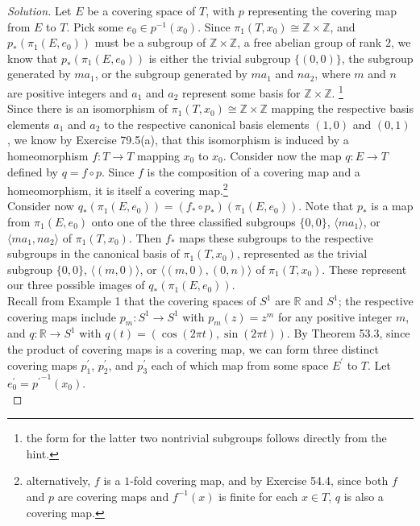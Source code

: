 \documentclass[11pt]{article}
\newcommand{\R}{\mathbb{R}}
\newcommand{\Z}{\mathbb{Z}}
\newenvironment{solution}
  {\renewcommand\qedsymbol{$\blacksquare$}\begin{proof}[Solution]}
  {\end{proof}}
\begin{document}
\begin{solution}

Let $E$ be a covering space of $T$, with $p$ representing the covering map from $E$ to $T$. Pick some $e_0 \in p^{-1}(x_0)$. 
Since $\pi_1(T, x_0) \cong \Z \times \Z$, and $p_{\ast} (\pi_1(E, e_0))$ must be a subgroup of $\Z \times \Z$, a free abelian group of rank $2$, we know that $p_{\ast} (\pi_1(E, e_0))$ is either the trivial subgroup $\{ (0, 0) \}$,
the subgroup generated by $ma_1$, or the subgroup generated by $ma_1$ and $na_2$, where $m$ and $n$ are positive integers and $a_1$ and $a_2$ represent some basis for $\Z \times \Z$.
\footnote{the form for the latter two nontrivial subgroups follows directly from the hint.} \\

Since there is an isomorphism of $\pi_1(T, x_0) \cong \Z \times \Z$ mapping the respective basis elements $a_1$ and $a_2$ to the respective canonical basis elements $(1, 0)$ and $(0, 1)$, we know by Exercise 79.5(a),
that this isomorphism is induced by a homeomorphism $f \colon T \rightarrow T$ mapping $x_0$ to $x_0$. Consider now the map $q \colon E \rightarrow T$ defined by $q = f \circ p$. Since $f$ is the composition of a covering map and 
a homeomorphism, it is itself a covering map.\footnote{alternatively, $f$ is a $1$-fold covering map, and by Exercise 54.4, since both $f$ and $p$ are covering maps and $f^{-1}(x)$ is finite for each $x \in T$, $q$ is also a covering map.} \\

Consider now $q_{\ast}(\pi_1(E, e_0)) = (f_{\ast} \circ p_{\ast}) (\pi_1(E, e_0))$. Note that $p_{\ast}$ is a map from $\pi_1(E, e_0)$ onto one of the three classified subgroups 
$\{ 0 , 0 \}$, $\langle ma_1 \rangle$, or $\langle ma_1, na_2 \rangle$ of $\pi_1(T, x_0)$. Then $f_{\ast}$ maps these subgroups to the respective subgroups in the canonical basis of $\pi_1(T, x_0)$, represented as the trivial subgroup $\{ 0, 0 \}$, $\langle (m, 0) \rangle$, or $\langle (m, 0), (0, n) \rangle$ of $\pi_1(T, x_0)$. 
These represent our three possible images of $q_{\ast}(\pi_1(E, e_0))$. \\

Recall from Example 1 that the covering spaces of $S^1$ are $\R$ and $S^1$; the respective covering maps include $p_m \colon S^1 \rightarrow  S^1$ with $p_m(z) = z^m$ for any positive integer $m$, 
and $q \colon \R \rightarrow S^1$ with $q(t) = (\cos (2\pi t), \sin (2\pi t))$. By Theorem 53.3, since the product of covering maps is a covering map, we can form three distinct covering maps $p^{\prime}_1$, $p^{\prime}_2$, and $p^{\prime}_3$ 
each of which map from some space $E^{\prime}$ to $T$. Let $e^{\prime}_0 = {p^{\prime}}^{-1}(x_0)$. \\


\end{solution}
\end{document}
